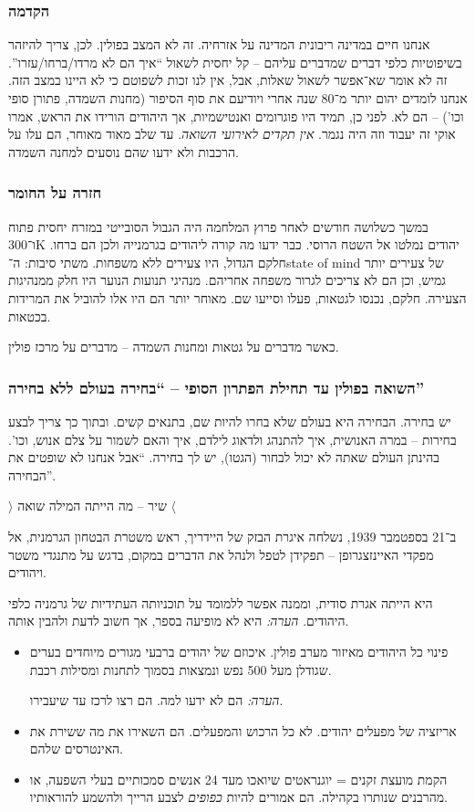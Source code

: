 \documentclass[a4paper]{book}
\begin{document}
	\subsubsection{הקדמה}
	אנחנו חיים במדינה ריבונית המדינה על אזרחיה. זה לא המצב בפולין. לכן, צריך להיזהר בשיפוטיות כלפי דברים שמדברים עליהם – קל יחסית לשאול ``איך הם לא מרדו/ברחו/עזרו''. זה לא אומר שא־אפשר לשאול שאלות, אבל, אין לנו זכות לשפוטם כי לא היינו במצב הזה. אנחנו לומדים יהום יותר מ־80 שנה אחרי ויודיעם את סוף הסיפור (מחנות השמדה, פתורן סופי וכו') – הם לא. לפני כן, תמיד היו פוגרומים ואנטישמיות, אך היהודים הורידו את הראש, אמרו אוקי זה יעבוד וזה היה נגמר. \textit{אין תקדים לאירועי השואה}. עד שלב מאוד מאוחר, הם עלו על הרכבות ולא ידעו שהם נוסעים למחנה השמדה. 
	
	\subsubsection{חזרה על החומר}
	במשך כשלושה חודשים לאחר פרוץ המלחמה היה הגבול הסובייטי במזרח יחסית פתוח ו־300K יהודים נמלטו אל השטח הרוסי. כבר ידעו מה קורה ליהודים בגרמנייה ולכן הם ברחו. חלקם הגדול, היו צעירים ללא משפחות. משתי סיבות: ה־state of mind של צעירים יותר גמיש, וכן הם לא צריכים לגרור משפחה אחריהם. מנהיגי תנועות הנוער היו חלק ממנהיגות הצעירה. חלקם, נכנסו לגטאות, פעלו וסייעו שם. מאוחר יותר הם היו אלו להוביל את המרידות בכטאות. 
	
	כאשר מדברים על גטאות ומחנות השמדה – מדברים על מרכז פולין. 
	\subsubsection{השואה בפולין עד תחילת הפתרון הסופי – ``בחירה בעולם ללא בחירה''}
	יש בחירה. הבחירה היא בעולם שלא בחרו להיות שם, בתנאים קשים. ובתוך כך צריך לבצע בחירות – במרה האנושית, איך להתנהג ולדאוג לילדם, איך והאם לשמור על צלם אנוש, וכו'. בהינתן העולם שאתה לא יכול לבחור (הגטו), יש לך בחירה. ``אבל אנחנו לא שופטים את הבחירה''. 
	
	$\rangle$ שיר – מה הייתה המילה שואה $\langle$
	
	ב־21 בספטמבר 1939, נשלחה איגרת הבזק של היידריך, ראש משטרת הבטחון הגרמנית, אל מפקדי האיינזצגרופן – תפקידן לטפל ולנהל את הדברים במקום, בדגש על מתנגדי משטר ויהודים. 
	
	היא הייתה אגרת סודית, וממנה אפשר ללמומד על תוכניותה העתידיות של גרמניה כלפי היהודים. \textit{הערה: }היא לא מופיעה בספר, אך חשוב לדעת ולהבין אותה. 
	
	\begin{itemize}
		\item פינוי כל היהודים מאיזור מערב פולין. איכוזם של יהודים ברבעי מגורים מיוחדים בערים שגודלן מעל 500 נפש ונמצאות בסמוך לתחנות ומסילות רכבת. 
		
		\textit{הערה: }הם לא ידעו למה. הם רצו לרכז עד שיעבירו. 
		\item אריזציה של מפעלים יהודים. לא כל הרכוש והמפעלים. הם השאירו את מה ששירת את האינטרסים שלהם. 
		\item הקמת מועצת זקנים = יוגנראטים שיואכו מעד 24 אנשים סמכותיים בעלי השפעה, או מהרבנים שנותרו בקהילה. הם אמורים להיות \textit{כפופים} לצבע הרייך ולהשמע להוראותיו. 
	\end{itemize}
	
\end{document}
